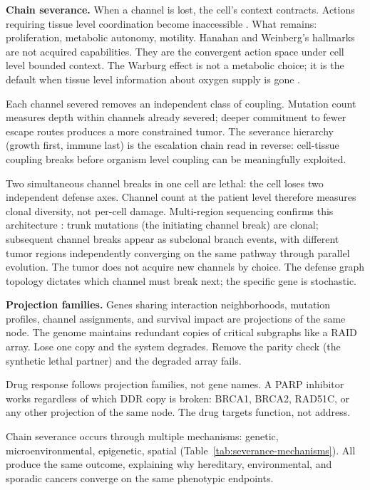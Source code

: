 \documentclass[11pt]{article}
\begin{document}
\textbf{Chain severance.}
When a channel is lost, the cell's context contracts. Actions
requiring tissue level coordination become inaccessible
\cite{McCarthy2026a, McCarthy2026b}. What remains: proliferation,
metabolic autonomy, motility. Hanahan and Weinberg's hallmarks
\cite{Hanahan2011} are not acquired capabilities. They are the
convergent action space under cell level bounded context. The
Warburg effect is not a metabolic choice; it is the default when
tissue level information about oxygen supply is gone
\cite{Warburg1956}.

Each channel severed removes an independent class of coupling.
Mutation count measures depth within channels already severed;
deeper commitment to fewer escape routes produces a more
constrained tumor. The severance hierarchy (growth first, immune
last) is the escalation chain read in reverse: cell-tissue coupling
breaks before organism level coupling can be meaningfully exploited.

Two simultaneous channel breaks in one cell are lethal: the cell
loses two independent defense axes. Channel count at the patient
level therefore measures clonal diversity, not per-cell damage.
Multi-region sequencing confirms this architecture
\cite{Gerlinger2012, JamalHanjani2017}: trunk mutations (the
initiating channel break) are clonal; subsequent channel breaks
appear as subclonal branch events, with different tumor regions
independently converging on the same pathway through parallel
evolution. The tumor does not acquire new channels by choice. The
defense graph topology dictates which channel must break next; the
specific gene is stochastic.

\textbf{Projection families.}
Genes sharing interaction neighborhoods, mutation profiles, channel
assignments, and survival impact are projections of the same node.
The genome maintains redundant copies of critical subgraphs like a
RAID array. Lose one copy and the system degrades. Remove the parity
check (the synthetic lethal partner) and the degraded array fails.

Drug response follows projection families, not gene names. A PARP
inhibitor works regardless of which DDR copy is broken: BRCA1,
BRCA2, RAD51C, or any other projection of the same node. The drug
targets function, not address.

Chain severance occurs through multiple mechanisms: genetic, micro\-environmental,
epigenetic, spatial (Table~\ref{tab:severance-mechanisms}). All
produce the same outcome, explaining why hereditary, environmental,
and sporadic cancers converge on the same phenotypic endpoints.
\end{document}
